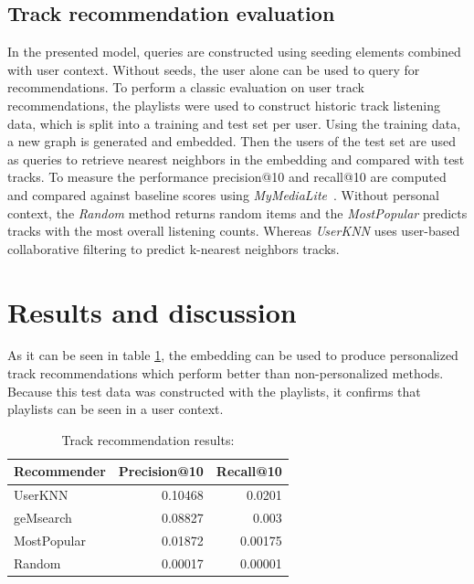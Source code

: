 \documentclass[sigconf]{acmart}
\begin{document}
\subsection{Track recommendation evaluation}
\label{subsec:track_rec_eval}
In the presented model, queries are constructed using seeding elements combined with user context. Without seeds, the user alone can be used to query for recommendations. To perform a classic evaluation on user track recommendations, the playlists were used to construct historic track listening data, which is split into a training and test set per user. Using the training data, a new graph is generated and embedded. Then the users of the test set are used as queries to retrieve nearest neighbors in the embedding and compared with test tracks. To measure the performance precision@10 and recall@10 are computed and compared against baseline scores using \emph{MyMediaLite}~\cite{Gantner2011MyMediaLite}. Without personal context, the \emph{Random} method returns random items and the \emph{MostPopular} predicts tracks with the most overall listening counts. Whereas \emph{UserKNN} uses user-based collaborative filtering to predict k-nearest neighbors tracks. 


\section{Results and discussion}

As it can be seen in table \ref{table:track_rec_results}, the embedding can be used to produce personalized track recommendations which perform better than non-personalized methods. Because this test data was constructed with the playlists, it confirms that playlists can be seen in a user context.

\begin{table}[H]
	\caption{Track recommendation results:}
	\label{table:track_rec_results}
	\begin{tabular}{lrr}
		\midrule 
		\textbf{Recommender} & \textbf{Precision@10} & \textbf{Recall@10} \\ 
		\midrule 
		UserKNN   & 0.10468 & 0.0201  \\
		geMsearch   & 0.08827 & 0.003  \\ %
		MostPopular   & 0.01872 & 0.00175  \\
		Random   & 0.00017 & 0.00001  \\
		\bottomrule
	\end{tabular}
\end{table}
\end{document}
